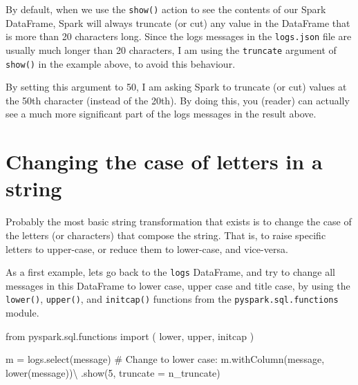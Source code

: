 \documentclass[
  11pt,
  letterpaper,
  DIV=11,
  numbers=noendperiod]{scrreprt}
\newenvironment{Shaded}{\begin{snugshade}}{\end{snugshade}}
\newcommand{\CommentTok}[1]{\textcolor[rgb]{0.37,0.37,0.37}{#1}}
\newcommand{\DecValTok}[1]{\textcolor[rgb]{0.68,0.00,0.00}{#1}}
\newcommand{\ImportTok}[1]{\textcolor[rgb]{0.00,0.46,0.62}{#1}}
\newcommand{\NormalTok}[1]{\textcolor[rgb]{0.00,0.23,0.31}{#1}}
\newcommand{\OperatorTok}[1]{\textcolor[rgb]{0.37,0.37,0.37}{#1}}
\newcommand{\StringTok}[1]{\textcolor[rgb]{0.13,0.47,0.30}{#1}}
\begin{document}
By default, when we use the \texttt{show()} action to see the contents
of our Spark DataFrame, Spark will always truncate (or cut) any value in
the DataFrame that is more than 20 characters long. Since the logs
messages in the \texttt{logs.json} file are usually much longer than 20
characters, I am using the \texttt{truncate} argument of \texttt{show()}
in the example above, to avoid this behaviour.

By setting this argument to 50, I am asking Spark to truncate (or cut)
values at the 50th character (instead of the 20th). By doing this, you
(reader) can actually see a much more significant part of the logs
messages in the result above.

\hypertarget{changing-the-case-of-letters-in-a-string}{%
\section{Changing the case of letters in a
string}\label{changing-the-case-of-letters-in-a-string}}

Probably the most basic string transformation that exists is to change
the case of the letters (or characters) that compose the string. That
is, to raise specific letters to upper-case, or reduce them to
lower-case, and vice-versa.

As a first example, lets go back to the \texttt{logs} DataFrame, and try
to change all messages in this DataFrame to lower case, upper case and
title case, by using the \texttt{lower()}, \texttt{upper()}, and
\texttt{initcap()} functions from the \texttt{pyspark.sql.functions}
module.

\begin{Shaded}
\begin{Highlighting}[]
\ImportTok{from}\NormalTok{ pyspark.sql.functions }\ImportTok{import}\NormalTok{ (}
\NormalTok{    lower,}
\NormalTok{    upper,}
\NormalTok{    initcap}
\NormalTok{)}

\NormalTok{m }\OperatorTok{=}\NormalTok{ logs.select(}\StringTok{\textquotesingle{}message\textquotesingle{}}\NormalTok{)}
\CommentTok{\# Change to lower case:}
\NormalTok{m.withColumn(}\StringTok{\textquotesingle{}message\textquotesingle{}}\NormalTok{, lower(}\StringTok{\textquotesingle{}message\textquotesingle{}}\NormalTok{))}\OperatorTok{\textbackslash{}}
\NormalTok{    .show(}\DecValTok{5}\NormalTok{, truncate }\OperatorTok{=}\NormalTok{ n\_truncate)}
\end{Highlighting}
\end{Shaded}
\end{document}
